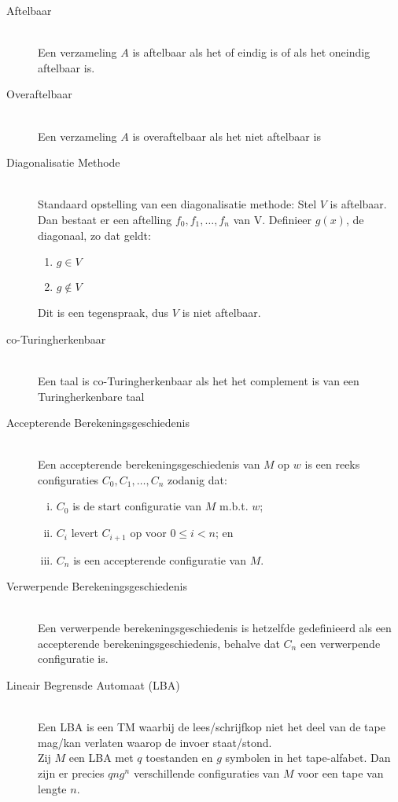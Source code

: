 \documentclass[]{article}
\begin{document}
\begin{itemize}
\begin{description}
	\item[Aftelbaar] \hfill \\
	Een verzameling $A$ is aftelbaar als het of eindig is of als het oneindig aftelbaar is.
	
	\item[Overaftelbaar] \hfill \\
	Een verzameling $A$ is overaftelbaar als het niet aftelbaar is
	
	\item[Diagonalisatie Methode] \hfill \\
	Standaard opstelling van een diagonalisatie methode:
	Stel $V$ is aftelbaar. Dan bestaat er een aftelling $f_0,f_1,\dots,f_n$ van V. 
	Definieer $g(x)$, de diagonaal, zo dat geldt:
	\begin{enumerate}
		\item $g \in V$
		\item $g \notin V$
	\end{enumerate}	
	Dit is een tegenspraak, dus $V$ is niet aftelbaar.
	
	\item[co-Turingherkenbaar] \hfill \\
	Een taal is co-Turingherkenbaar als het het complement is van een Turingherkenbare taal
	
	\item[Accepterende Berekeningsgeschiedenis] \hfill \\
	Een accepterende berekeningsgeschiedenis van $M$ op $w$ is een reeks configuraties $C_0,C_1,\dots,C_n$ zodanig dat:
	\begin{enumerate}[i.]
		\item $C_0$ is de start configuratie van $M$ m.b.t. $w$;
		\item $C_i$ levert $C_{i+1}$ op voor $0 \leq i < n$; en
		\item $C_n$ is een accepterende configuratie van $M$.
	\end{enumerate}
	
	\item[Verwerpende Berekeningsgeschiedenis] \hfill \\
	Een verwerpende berekeningsgeschiedenis is hetzelfde gedefinieerd als een accepterende berekeningsgeschiedenis, behalve dat $C_n$ een verwerpende configuratie is.
	
	\item[Lineair Begrensde Automaat (LBA)] \hfill \\
	Een LBA is een TM waarbij de lees/schrijfkop niet het deel van de tape mag/kan verlaten waarop de invoer staat/stond.\\
	Zij $M$ een LBA met $q$ toestanden en $g$ symbolen in het tape-alfabet. Dan zijn er precies $qng^n$ verschillende configuraties van $M$ voor een tape van lengte $n$.
	

\end{description}
\end{itemize}
\end{document}
